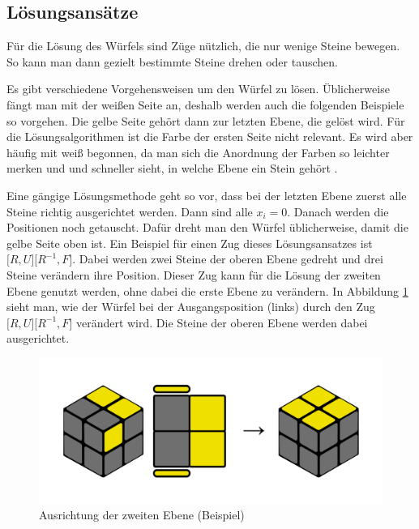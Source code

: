 \documentclass[12pt,a4paper, usenames, dvipsnames]{article}
\theoremstyle{mystyle}
\theoremstyle{definition}
\begin{document}
\subsection*{Lösungsansätze}
Für die Lösung des Würfels sind Züge nützlich, die nur wenige Steine bewegen. So kann man dann gezielt bestimmte Steine drehen oder tauschen. 

Es gibt verschiedene Vorgehensweisen um den Würfel zu lösen. Üblicherweise fängt man mit der weißen Seite an, deshalb werden auch die folgenden Beispiele so vorgehen. Die gelbe Seite gehört dann zur letzten Ebene, die gelöst wird. 
Für die Lösungsalgorithmen ist die Farbe der ersten Seite nicht relevant. Es wird aber häufig mit weiß begonnen, da man sich die Anordnung der Farben so leichter merken und und schneller sieht, in welche Ebene ein Stein gehört \cite{RF}. 

Eine gängige Lösungsmethode geht so vor, dass bei der letzten Ebene zuerst alle Steine richtig ausgerichtet werden. Dann sind alle $x_i=0$. Danach werden die Positionen noch getauscht. 
Dafür dreht man den Würfel üblicherweise, damit die gelbe Seite oben ist. 
Ein Beispiel für einen Zug dieses Lösungsansatzes ist $\lbrack R, U \rbrack \lbrack R^{-1}, F \rbrack$. Dabei werden zwei Steine der oberen Ebene gedreht und drei Steine verändern ihre Position. Dieser Zug kann für die Lösung der zweiten Ebene genutzt werden, ohne dabei die erste Ebene zu verändern. \cite{RF2} 
In Abbildung \ref{25} sieht man, wie der Würfel bei der Ausgangsposition (links) durch den Zug $\lbrack R, U \rbrack \lbrack R^{-1}, F \rbrack$ verändert wird. Die Steine der oberen Ebene werden dabei ausgerichtet.

\begin{figure}[h]
\centering
\includegraphics[scale=0.12]{isiakanm.png}
\caption{Ausrichtung der zweiten Ebene (Beispiel)}
\label{25}
\end{figure}
\end{document}
